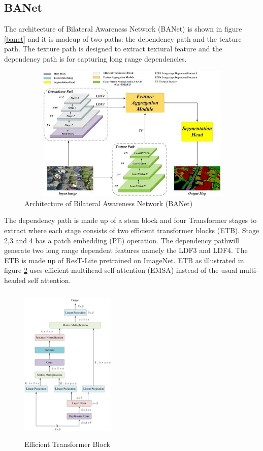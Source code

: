 \subsection{BANet}
The architecture of Bilateral Awareness Network (BANet) is shown in figure \ref{banet} and it is madeup of two paths: the dependency path and the texture path. The texture path is designed to extract textural feature and the dependency path is for capturing long range dependencies.

\FloatBarrier
\begin{figure}[ht]
\includegraphics[width=12.5cm, height=6.5cm]{images/banet.jpg}
\centering
\caption{Architecture of Bilateral Awareness Network (BANet)}
\label{fig:banet}
\end{figure}

The dependency path is made up of a stem block and four Transformer stages to extract where each stage consists of two efficient transformer blocks (ETB). Stage 2,3 and 4 has a patch embedding (PE) operation. The dependency pathwill generate two long range dependent features namely the LDF3 and LDF4. The ETB is made up of ResT-Lite \cite{restlite} pretrained on ImageNet. ETB as illustrated in figure \ref{fig:etb} uses efficient multihead self-attention (EMSA) instead of the usual multi-headed self attention.

\FloatBarrier
\begin{figure}[ht]
\includegraphics[width=4.5cm, height=7.5cm]{images/etb.png}
\centering
\caption{Efficient Transformer Block}
\label{fig:etb}
\end{figure}

